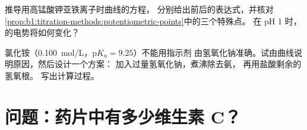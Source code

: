 \begin{exercise}[$\star\star\star$]\label{exo:b1:titration-methods:11}
推导用高锰酸钾亚铁离子时曲线的方程，
分别给出前后的表达式，并核对
\cref{prop:b1:titration-methods:potentiometric-points}中的三个特殊点。
在 pH 1 时，的电势将如何变化？
\end{exercise}

\begin{exercise}[$\star\star\star$]\label{exo:b1:titration-methods:12}
氯化铵（\qty{0.100}{mol/L}，$\mathrm{p}K_a = 9.25$）不能用指示剂
由氢氧化钠准确。试由曲线说明原因，然后设计一个方案：
加入过量氢氧化钠，煮沸除去氨，
再用盐酸剩余的氢氧根。
写出计算过程。
\end{exercise}

\section{问题：药片中有多少维生素 C？}

